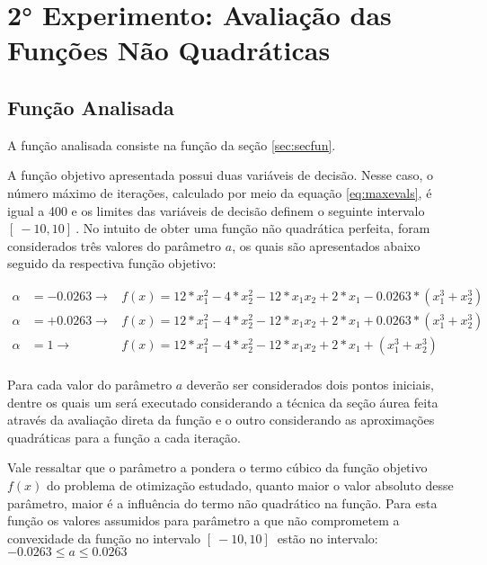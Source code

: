 

\section{2° Experimento: Avaliação das Funções Não Quadráticas}
    \subsection{Função Analisada}

    A função analisada consiste na função da seção \ref{sec:secfun}.

    A função objetivo apresentada possui duas variáveis de decisão. Nesse caso, o número máximo de iterações, calculado por meio da equação \ref{eq:maxevals}, é igual a 400 e os limites das variáveis de decisão definem o seguinte intervalo $[\ -10 , 10 ]\ $. No intuito de obter uma função não quadrática perfeita, foram considerados três valores do parâmetro $a$, os quais são apresentados abaixo seguido da respectiva função objetivo:

    \begin{equation*}   
        \begin{aligned}
            \alpha &=-0.0263 \rightarrow &f(x) = 12*x_1^2 - 4*x_2^2 - 12*x_1x_2 + 2*x_1 -0.0263*(x_1^3+x_2^3)\\
            \alpha &=+0.0263 \rightarrow &f(x) = 12*x_1^2 - 4*x_2^2 - 12*x_1x_2 + 2*x_1 + 0.0263*(x_1^3+x_2^3)\\
            \alpha &=1 \rightarrow &f(x) = 12*x_1^2 - 4*x_2^2 - 12*x_1x_2 + 2*x_1 + (x_1^3+x_2^3)\\   
        \end{aligned}
    \end{equation*}
 
    Para cada valor do parâmetro $a$ deverão ser considerados dois pontos iniciais, dentre os quais um será executado considerando a técnica da seção áurea feita através da avaliação direta da função e o outro considerando as aproximações quadráticas para a função a cada iteração.

    Vale ressaltar que o parâmetro a pondera o termo cúbico da função objetivo $f(x)$ do problema de otimização estudado, quanto maior o valor absoluto desse parâmetro, maior é a influência do termo não quadrático na função. Para esta função os valores assumidos para parâmetro  a que não comprometem a convexidade da função   no intervalo $[\ -10 , 10 ]\ $ estão no intervalo: \\ {\centering $-0.0263 \leq a \leq 0.0263$} \\
    \vspace{2mm}

